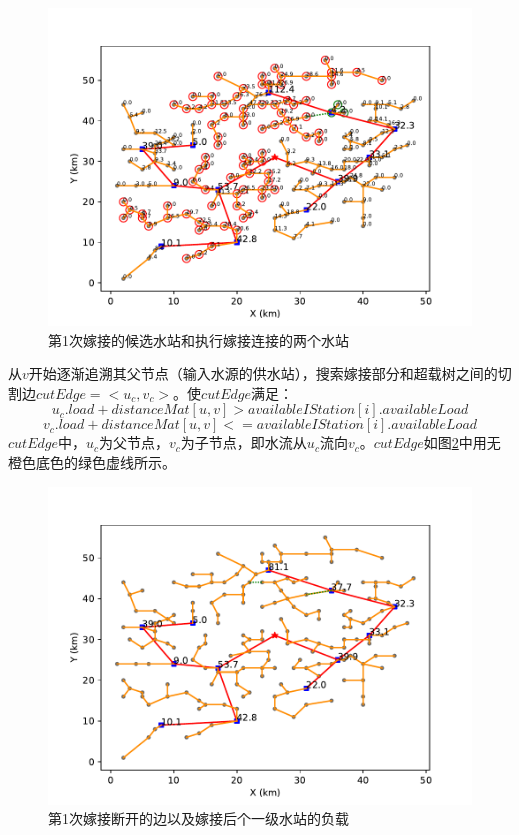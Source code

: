 \documentclass{cumcmthesis}
\begin{document}
  \begin{figure}[!h]
    \centering
    \includegraphics[width=.95\textwidth]{figure/pipline_graft_connection_0.pdf}
    \caption{第1次嫁接的候选水站和执行嫁接连接的两个水站}
    \label{fig:pipline_graft_connection_0}
  \end{figure}
  从$v$开始逐渐追溯其父节点（输入水源的供水站），搜索嫁接部分和超载树之间的切割边$cutEdge=<u_c, v_c>$。使$cutEdge$满足：
  $$u_c.load + distanceMat[u, v]>availableIStation[i].availableLoad$$
  $$v_c.load + distanceMat[u, v]<=availableIStation[i].availableLoad$$
  $cutEdge$中，$u_c$为父节点，$v_c$为子节点，即水流从$u_c$流向$v_c$。$cutEdge$如图\cref{fig:pipline_graft_cut_0}中用无橙色底色的绿色虚线所示。
  \begin{figure}[!h]
    \centering
    \includegraphics[width=.95\textwidth]{figure/pipline_graft_cut_0.pdf}
    \caption{第1次嫁接断开的边以及嫁接后个一级水站的负载}
    \label{fig:pipline_graft_cut_0}
  \end{figure}
\end{document}
